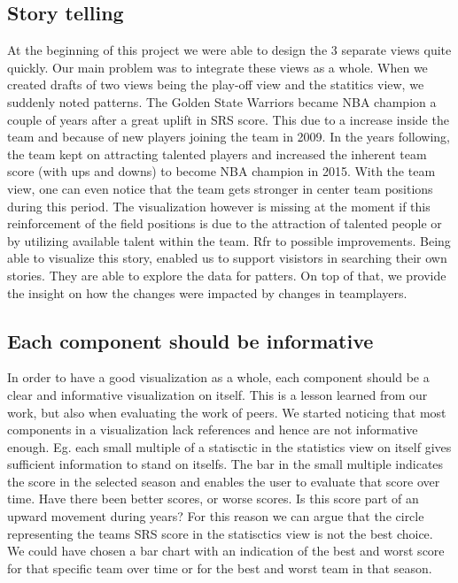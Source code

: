 \documentclass{sigchi}
\begin{document}
\subsection{Story telling}
At the beginning of this project we were able to design the 3 separate views 
quite quickly. Our main problem was to integrate these views as a whole. When we created drafts of two views being the play-off view and the statitics view, we suddenly noted patterns. The Golden State Warriors became NBA champion a couple of years after a great uplift in SRS score. This due to a increase inside the team and because of new players joining the team in 2009. In the years following, the team kept on attracting talented players and increased the inherent team score (with ups and downs) to become NBA champion in 2015. With the team view, one can even notice that the team gets stronger in center team positions during this period. The visualization however is missing at the moment if this reinforcement of the field positions is due to the attraction of talented people or by utilizing available talent within the team. Rfr to possible improvements. Being able to visualize this story, enabled us to support visistors in searching their own stories. They are able to explore the data for patters. On top of that, we provide the insight on how the changes were impacted by changes in teamplayers.

\subsection{Each component should be informative}
In order to have a good visualization as a whole, each component should be a clear and informative visualization on itself. This is a lesson learned from our work, but also when evaluating the work of peers. We started noticing that most components in a visualization lack references and hence are not informative enough. Eg. each small multiple of a statisctic in the statistics view on itself gives sufficient information to stand on itselfs. The bar in the small multiple indicates the score in the selected season and enables the user to evaluate that score over time. Have there been better scores, or worse scores. Is this score part of an upward movement during years? 
For this reason we can argue that the circle representing the teams SRS score in the statisctics view is not the best choice. We could have chosen a bar chart with an indication of the best and worst score for that specific team over time or for the best and worst team in that season.
\end{document}
